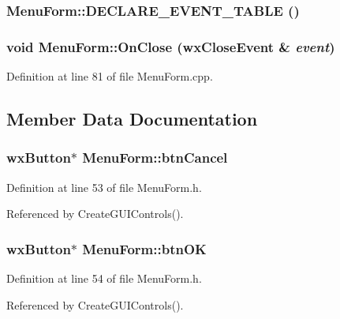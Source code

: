 \subsubsection{\setlength{\rightskip}{0pt plus 5cm}Menu\-Form::DECLARE\_\-EVENT\_\-TABLE ()\hspace{0.3cm}{\tt  [private]}}\label{class_menu_form_50cc24c984979862849da7d5a86f79ac}


\subsubsection{\setlength{\rightskip}{0pt plus 5cm}void Menu\-Form::On\-Close (wx\-Close\-Event \& {\em event})\hspace{0.3cm}{\tt  [private]}}\label{class_menu_form_3f2671cebafd9b86d42f2fa3464efd8a}




Definition at line 81 of file Menu\-Form.cpp.

\subsection{Member Data Documentation}
\subsubsection{\setlength{\rightskip}{0pt plus 5cm}wx\-Button$\ast$ {\bf Menu\-Form::btn\-Cancel}}\label{class_menu_form_6e2d848d8409de85a8a7fca37ae12b5b}




Definition at line 53 of file Menu\-Form.h.

Referenced by Create\-GUIControls().
\subsubsection{\setlength{\rightskip}{0pt plus 5cm}wx\-Button$\ast$ {\bf Menu\-Form::btn\-OK}}\label{class_menu_form_cce1b6790bf5ef5677a53f70ac4906c2}




Definition at line 54 of file Menu\-Form.h.

Referenced by Create\-GUIControls().
